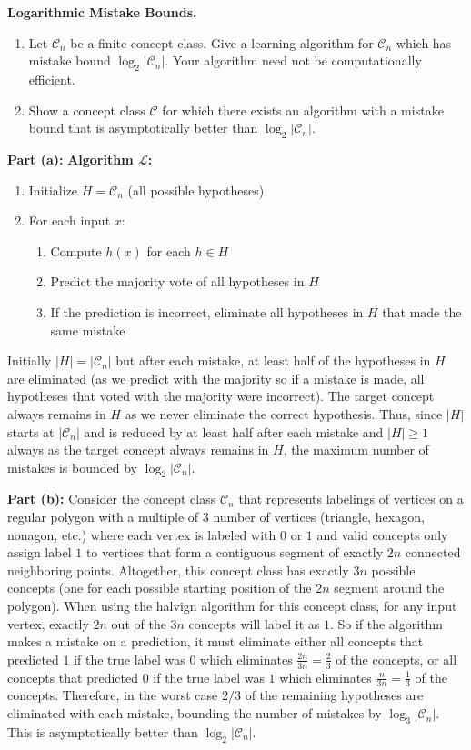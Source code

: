 \documentclass[11pt]{article}
\newcommand*{\C}{{\mathcal C}}
\DeclareMathOperator{\1}{\mathbbm{1}}
\begin{document}
\begin{problem} [10pts] \textbf{Logarithmic Mistake Bounds.} \quad
	\begin{enumerate}[label=\alph*)]
		\item Let $\C_n$ be a finite concept class.  Give a learning
		algorithm for $\C_n$ which has mistake bound $\log_2|\C_n|.$  Your algorithm
		need not be computationally efficient.
		\item Show a concept class $\C$ for which there exists an algorithm with a mistake bound that is asymptotically better than $\log_2|\C_n|$.
	\end{enumerate}

\textbf{Part (a):} \textbf{Algorithm $\mathcal{L}$:} 
\begin{enumerate}
	\item Initialize $H = \mathcal{C}_n$ (all possible hypotheses)
	\item For each input $x$:
		\begin{enumerate}
			\item Compute $h(x)$ for each $h \in H$
			\item Predict the majority vote of all hypotheses in $H$
			\item If the prediction is incorrect, eliminate all hypotheses in $H$ that made the same mistake
		\end{enumerate}
\end{enumerate}
Initially $|H| = |\mathcal{C}_n|$ but after each mistake, at least half of the hypotheses in $H$ are eliminated (as we predict with the majority so if a mistake is made, all hypotheses that voted with the majority were incorrect). The target concept always remains in $H$ as we never eliminate the correct hypothesis. Thus, since $|H|$ starts at $|\mathcal{C}_n|$ and is reduced by at least half after each mistake and $|H| \geq 1$ always as the target concept always remains in $H$, the maximum number of mistakes is bounded by $\log_2|\mathcal{C}_n|$.

\textbf{Part (b):} Consider the concept class $\mathcal{C}_n$ that represents labelings of vertices  on a regular polygon with a multiple of $3$ number of vertices (triangle, hexagon, nonagon, etc.) where each vertex is labeled with $0$ or $1$ and valid concepts only assign label $1$ to vertices that form a contiguous segment of exactly $2n$ connected neighboring points. Altogether, this concept class has exactly $3n$ possible concepts (one for each possible starting position of the $2n$ segment around the polygon). When using the halvign algorithm for this concept class, for any input vertex, exactly $2n$ out of the $3n$ concepts will label it as $1$. So if the algorithm makes a mistake on a prediction, it must eliminate either all concepts that predicted $1$ if the true label was $0$ which eliminates $\frac{2n}{3n}=\frac{2}{3}$ of the concepts, or all concepts that predicted $0$ if the true label was $1$ which eliminates $\frac{n}{3n}=\frac{1}{3}$ of the concepts. Therefore, in the worst case $2/3$ of the remaining hypotheses are eliminated with each mistake, bounding the number of mistakes by $\log_{3} |\mathcal{C}_n|$. This is asymptotically better than $\log_2 |\mathcal{C}_n|$.

\end{problem}
\end{document}
